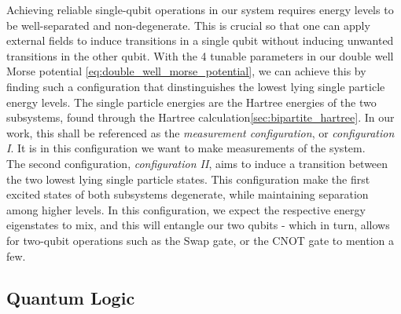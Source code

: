\documentclass{subfiles}
\begin{document}
Achieving reliable single-qubit operations in our system requires energy levels to be well-separated and non-degenerate. This is crucial so that one can apply external fields to induce transitions in a single qubit without inducing unwanted transitions in the other qubit. With the 4 tunable parameters in our double well Morse potential \eqref{eq:double_well_morse_potential}, we can achieve this by finding such a configuration that dinstinguishes the lowest lying single particle energy levels. The single particle energies are the Hartree energies of the two subsystems, found through the Hartree calculation\ref{sec:bipartite_hartree}. In our work, this shall be referenced as the \emph{measurement configuration}, or \emph{configuration I}. It is in this configuration we want to make measurements of the system. 
\\ 

The second configuration, \emph{configuration II}, aims to induce a transition between the two lowest lying single particle states. This configuration make the first excited states of both subsystems degenerate, while maintaining separation among higher levels. In this configuration, we expect the respective energy eigenstates to mix, and this will entangle our two qubits - which in turn, allows for two-qubit operations such as the Swap gate, or the CNOT gate to mention a few\cite{leinonen2024coulomb, nichol2017high}.
\subsection{Quantum Logic}
\end{document}
